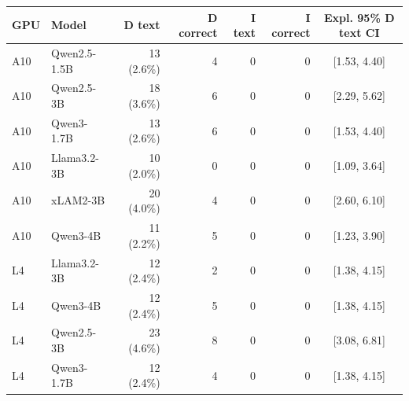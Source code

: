 \begin{tabular}{llrrrrc}
\toprule
GPU & Model & D text & D correct & I text & I correct & Expl. 95\% D text CI \\
\midrule
A10 & Qwen2.5-1.5B & 13 (2.6\%) & 4 & 0 & 0 & [1.53, 4.40] \\
A10 & Qwen2.5-3B & 18 (3.6\%) & 6 & 0 & 0 & [2.29, 5.62] \\
A10 & Qwen3-1.7B & 13 (2.6\%) & 6 & 0 & 0 & [1.53, 4.40] \\
A10 & Llama3.2-3B & 10 (2.0\%) & 0 & 0 & 0 & [1.09, 3.64] \\
A10 & xLAM2-3B & 20 (4.0\%) & 4 & 0 & 0 & [2.60, 6.10] \\
A10 & Qwen3-4B & 11 (2.2\%) & 5 & 0 & 0 & [1.23, 3.90] \\
L4 & Llama3.2-3B & 12 (2.4\%) & 2 & 0 & 0 & [1.38, 4.15] \\
L4 & Qwen3-4B & 12 (2.4\%) & 5 & 0 & 0 & [1.38, 4.15] \\
L4 & Qwen2.5-3B & 23 (4.6\%) & 8 & 0 & 0 & [3.08, 6.81] \\
L4 & Qwen3-1.7B & 12 (2.4\%) & 4 & 0 & 0 & [1.38, 4.15] \\
\bottomrule
\end{tabular}
